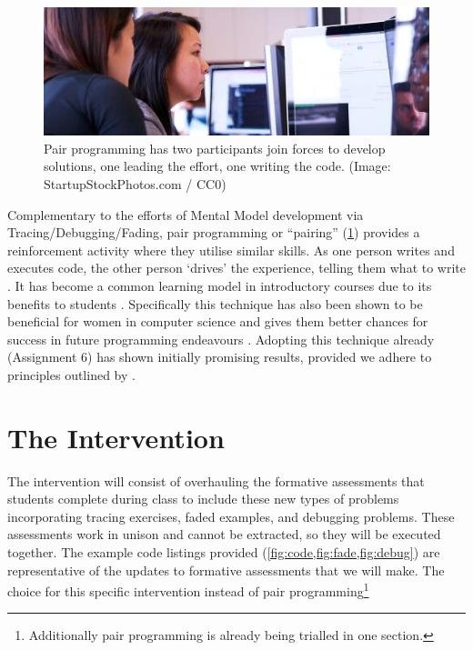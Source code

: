 \documentclass[paper=a4,]{tufte-handout}
\begin{document}
\begin{figure}
\centering
\includegraphics{./pair-programming.jpg}
\caption{Pair programming has two participants join forces to develop
solutions, one leading the effort, one writing the code. (Image:
StartupStockPhotos.com / CC0)\label{fig:pair}}
\end{figure}

Complementary to the efforts of Mental Model development via
Tracing/Debugging/Fading, pair programming or ``pairing''
(\cref{fig:pair}) provides a reinforcement activity where they utilise
similar skills. As one person writes and executes code, the other person
`drives' the experience, telling them what to write
\citep{Williams,Williams_2001}. It has become a common learning
model in introductory courses due to its benefits to students
\citep{mendes2005investigating,mendes2006replicated,Hannay_2007}.
Specifically this technique has also been shown to be beneficial for
women in computer science and gives them better chances for success in
future programming endeavours \citep{werner2004pair}. Adopting this
technique already (Assignment 6) has shown initially promising results,
provided we adhere to principles outlined by \citep{Mentz_2008}.

\hypertarget{the-intervention}{%
\section{The Intervention}\label{the-intervention}}

      The intervention will consist of overhauling the formative assessments that students complete during class to include these new types of problems incorporating tracing exercises, faded examples, and debugging problems. These assessments work in unison and cannot be extracted, so they will be executed together. The example code listings provided (\cref{fig:code,fig:fade,fig:debug}) are representative of the updates to formative assessments that we will make. The choice for this specific intervention instead of pair programming\footnote{Additionally pair programming is already being trialled in one section.}
\end{document}
